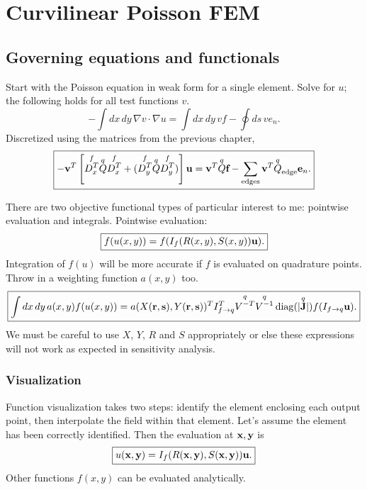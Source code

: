 \chapter{Curvilinear Poisson FEM}
\label{chap:curvilinear_poisson_fem}

\section{Governing equations and functionals}

Start with the Poisson equation in weak form for a single element.  Solve for $u$; the following holds for all test functions $v$.
%
\begin{equation}
-\int dx\, dy\, \nabla v \cdot \nabla u = \int dx\, dy\, vf - \oint ds\, v e_n.
\end{equation}
%
Discretized using the matrices from the previous chapter, 
%
\begin{equation}
\boxed{
-\ve{v}^T \left[ \f{D_x^T} \q{Q} \f{D_x^T} + (\f{D_y^T} \q{Q} \f{D_y^T})\right] \ve u
=
\ve{v}^T \q{Q} \ve{f} - \sum_\textrm{edges} \ve{v}^T \q{Q}_\textrm{edge} \ve{e}_n.
}%
\end{equation}

There are two objective functional types of particular interest to me: pointwise evaluation and integrals.  Pointwise evaluation:
%
\begin{equation}
\boxed{
f(u(x,y)) = f(I_f(R(x,y), S(x,y)) \ve u).
}%
\end{equation}
%
Integration of $f(u)$ will be more accurate if $f$ is evaluated on quadrature points.  Throw in a weighting function $a(x,y)$ too.
%
\begin{equation}
\boxed{
\int dx \, dy \, a(x,y) f(u(x,y)) = a(X(\ve r, \ve s), Y(\ve r, \ve s))^T I_{f \rightarrow q}^T \q{V^{-T}} \q{V^{-1}} \operatorname{diag}(|\q{\ve J}|) f(I_{f \rightarrow q} \ve u).
}%
\end{equation}
%
We must be careful to use $X$, $Y$, $R$ and $S$ appropriately or else these expressions will not work as expected in sensitivity analysis.

\subsection{Visualization}

Function visualization takes two steps: identify the element enclosing each output point, then interpolate the field within that element.  Let's assume the element has been correctly identified.  Then the evaluation at $\textbf{x}, \textbf{y}$ is
%
\begin{equation}
\boxed{
u(\ve x, \ve y) = I_f(R(\ve x, \ve y), S(\ve x, \ve y)) \ve u.
}%
\end{equation}
%
Other functions $f(x,y)$ can be evaluated analytically.

